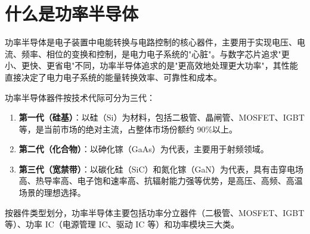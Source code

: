 
\section{什么是功率半导体}

功率半导体是电子装置中电能转换与电路控制的核心器件，主要用于实现电压、电流、频率、相位的变换和控制，是电力电子系统的"心脏"。与数字芯片追求"更小、更快、更省电"不同，功率半导体追求的是"更高效地处理更大功率"，其性能直接决定了电力电子系统的能量转换效率、可靠性和成本。

\vspace{0.3em}

功率半导体器件按技术代际可分为三代：

\begin{enumerate}[leftmargin=2em]
\item \textbf{第一代（硅基）}：以硅（Si）为材料，包括二极管、晶闸管、MOSFET、IGBT 等，是当前市场的绝对主流，占整体市场份额约 90\%以上。
\item \textbf{第二代（化合物）}：以砷化镓（GaAs）为代表，主要用于射频领域。
\item \textbf{第三代（宽禁带）}：以碳化硅（SiC）和氮化镓（GaN）为代表，具有击穿电场高、热导率高、电子饱和速率高、抗辐射能力强等优势，是高压、高频、高温场景的理想选择。
\end{enumerate}

按器件类型划分，功率半导体主要包括功率分立器件（二极管、MOSFET、IGBT 等）、功率 IC（电源管理 IC、驱动 IC 等）和功率模块三大类。


